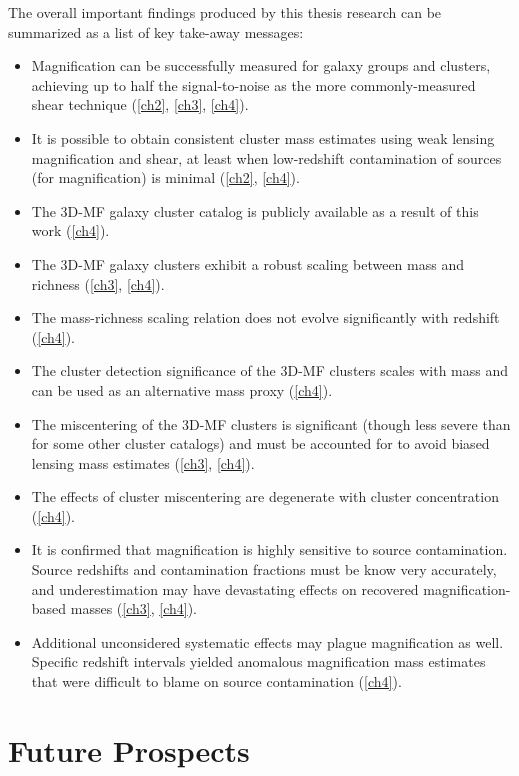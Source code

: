 The overall important findings produced by this thesis research can be summarized as a list of key take-away messages:
\begin{itemize}
\item Magnification can be successfully measured for galaxy groups and clusters, achieving up to half the signal-to-noise as the more commonly-measured shear technique (\autoref{ch2}, \autoref{ch3}, \autoref{ch4}).
\item It is possible to obtain consistent cluster mass estimates using weak lensing magnification and shear, at least when low-redshift contamination of sources (for magnification) is minimal (\autoref{ch2}, \autoref{ch4}).
\item The \ac{3D-MF} galaxy cluster catalog is publicly available as a result of this work (\autoref{ch4}).
\item The \ac{3D-MF} galaxy clusters exhibit a robust scaling between mass and richness (\autoref{ch3}, \autoref{ch4}).
\item The mass-richness scaling relation does not evolve significantly with redshift (\autoref{ch4}).
\item The cluster detection significance of the \ac{3D-MF} clusters scales with mass and can be used as an alternative mass proxy (\autoref{ch4}).
\item The miscentering of the \ac{3D-MF} clusters is significant (though less severe than for some other cluster catalogs) and must be accounted for to avoid biased lensing mass estimates (\autoref{ch3}, \autoref{ch4}).
\item The effects of cluster miscentering are degenerate with cluster concentration (\autoref{ch4}).
\item It is confirmed that magnification is highly sensitive to source contamination. Source redshifts and contamination fractions must be know very accurately, and underestimation may have devastating effects on recovered magnification-based masses (\autoref{ch3}, \autoref{ch4}).
\item Additional unconsidered systematic effects may plague magnification as well. Specific redshift intervals yielded anomalous magnification mass estimates that were difficult to blame on source contamination (\autoref{ch4}).
\end{itemize}

\section{Future Prospects}
\label{sec:future}

